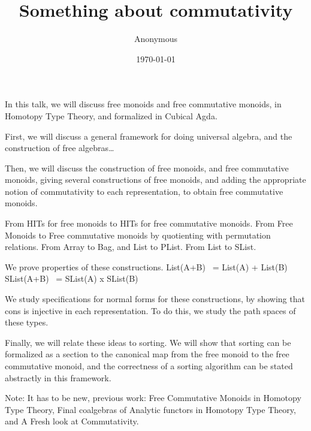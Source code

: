 \documentclass{article}
\title{Something about commutativity}
\author{Anonymous}
\date{\today}
\begin{document}
\maketitle
In this talk, we will discuss free monoids and free commutative monoids, in Homotopy Type Theory, and formalized in
Cubical Agda.

First, we will discuss a general framework for doing universal algebra, and the construction of free algebras\dots

Then, we will discuss the construction of free monoids, and free commutative monoids, giving several constructions of
free monoids, and adding the appropriate notion of commutativity to each representation, to obtain free commutative
monoids. 

From HITs for free monoids to HITs for free commutative monoids.
From Free Monoids to Free commutative monoids by quotienting with permutation relations.
From Array to Bag, and List to PList.
From List to SList.

We prove properties of these constructions.
List(A+B) ~= List(A) + List(B)
SList(A+B) ~= SList(A) x SList(B)

We study specifications for normal forms for these constructions, by showing that cons is injective in each
representation. To do this, we study the path spaces of these types.

Finally, we will relate these ideas to sorting. We will show that sorting can be formalized as a section to the
canonical map from the free monoid to the free commutative monoid, and the correctness of a sorting algorithm can be
stated abstractly in this framework.

Note: It has to be new, previous work: Free Commutative Monoids in Homotopy Type Theory, Final coalgebras of Analytic
functors in Homotopy Type Theory, and A Fresh look at Commutativity.

\printbibliography
\end{document}
